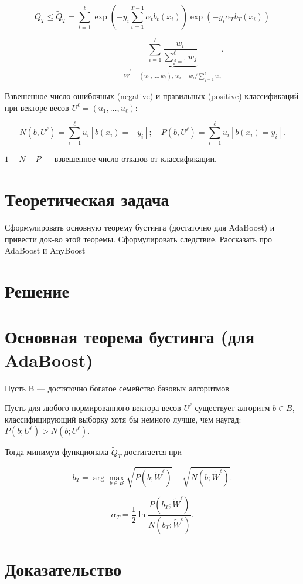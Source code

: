\[
    Q_T \leq \widetilde{Q}_T = \sum_{i=1}^\ell \exp\left(-y_i \sum_{t=1}^{T-1} \alpha_t b_t(x_i)\right) \exp\left(-y_i \alpha_T b_T(x_i)\right)
\]

\[
    \phantom{Q_T \leq \widetilde{Q}_T} = \underbrace{\sum_{i=1}^\ell \frac{w_i}{\sum_{j=1}^\ell w_j}}_{\widetilde{W}^\ell = (\widetilde{w}_1, \ldots, \widetilde{w}_\ell), \, \widetilde{w}_i = w_i / \sum_{j=1}^\ell w_j}.
\]

Взвешенное число ошибочных (negative) и правильных (positive) классификаций при векторе весов \(U^\ell = (u_1, \ldots, u_\ell)\):

\[
    N(b, U^\ell) = \sum_{i=1}^\ell u_i [b(x_i) = -y_i]; \quad P(b, U^\ell) = \sum_{i=1}^\ell u_i [b(x_i) = y_i].
\]

\(1 - N - P\) — взвешенное число отказов от классификации.

\section*{Теоретическая задача}
Сформулировать основную теорему бустинга (достаточно для AdaBoost) и привести док-во этой теоремы. Сформулировать следствие. Рассказать про AdaBoost и AnyBoost

\section*{Решение}
\section*{Основная теорема бустинга (для AdaBoost)}
Пусть B — достаточно богатое семейство базовых алгоритмов

Пусть для любого нормированного вектора весов \(U^\ell\) существует алгоритм \(b \in B\), классифицирующий выборку хотя бы немного лучше, чем наугад: \(P(b; U^\ell) > N(b; U^\ell)\).

Тогда минимум функционала \(\widetilde{Q}_T\) достигается при

\[
    b_T = \arg \max_{b \in B} \sqrt{P(b; \widetilde{W}^\ell)} - \sqrt{N(b; \widetilde{W}^\ell)}.
\]

\[
    \alpha_T = \frac{1}{2} \ln \frac{P(b_T; \widetilde{W}^\ell)}{N(b_T; \widetilde{W}^\ell)}.
\]

\section*{Доказательство}

